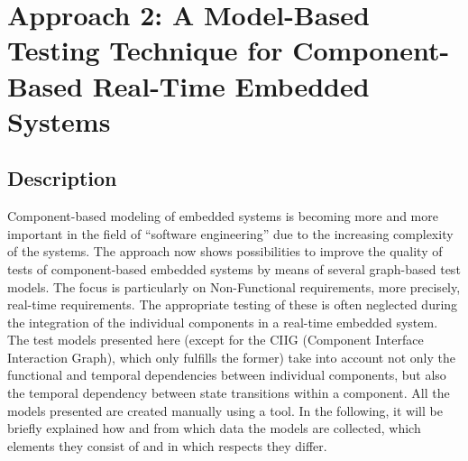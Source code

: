 \section{Approach 2: A Model-Based Testing Technique for Component-Based Real-Time
Embedded Systems\label{sec:Approach-2}}

\subsection{Description}

Component-based modeling of embedded systems is becoming more and
more important in the field of \enquote{software engineering}
due to the increasing complexity of the systems. The approach now
shows possibilities to improve the quality of tests of component-based
embedded systems by means of several graph-based test models. The
focus is particularly on Non-Functional requirements, more precisely,
real-time requirements. The appropriate testing of these is often
neglected during the integration of the individual components in a
real-time embedded system. The test models presented here (except
for the CIIG (Component Interface Interaction Graph), which only fulfills
the former) take into account not only the functional and temporal
dependencies between individual components, but also the temporal
dependency between state transitions within a component. All the models
presented are created manually using a tool. In the following, it
will be briefly explained how and from which data the models are collected,
which elements they consist of and in which respects they differ.

